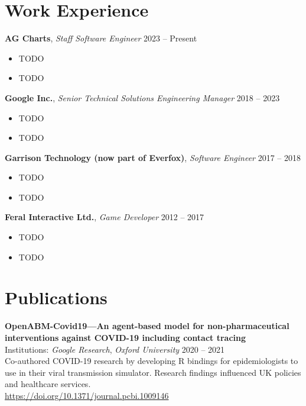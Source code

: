 \documentclass[a4paper,10pt]{article}
\begin{document}
{\begin{minipage}[t]{0.72\textwidth}
    \section*{\color{navy} Work Experience}
    \textbf{AG Charts}, \textit{Staff Software Engineer} \hfill 2023 -- Present
    \begin{itemize}[leftmargin=1.5em, nosep]
        \item TODO
        \item TODO
    \end{itemize}
    \vspace{0.5em}
    \textbf{Google Inc.}, \textit{Senior Technical Solutions Engineering Manager} \hfill 2018 -- 2023
    \begin{itemize}[leftmargin=1.5em, nosep]
        \item TODO
        \item TODO
    \end{itemize}
    \vspace{0.5em}
    \textbf{Garrison Technology (now part of Everfox)}, \textit{Software Engineer} \hfill 2017 -- 2018
    \begin{itemize}[leftmargin=1.5em, nosep]
        \item TODO
        \item TODO
    \end{itemize}
    \vspace{0.5em}
    \textbf{Feral Interactive Ltd.}, \textit{Game Developer} \hfill 2012 -- 2017
    \begin{itemize}[leftmargin=1.5em, nosep]
        \item TODO
        \item TODO
    \end{itemize}
    \section*{\color{navy} Publications}
    \textbf{OpenABM-Covid19—An agent-based model for non-pharmaceutical interventions against COVID-19 including contact tracing}\\
    Institutions: \textit{Google Research}, \textit{Oxford University} \hfill 2020 -- 2021\\[1.0em]
    Co-authored COVID-19 research by developing R bindings for epidemiologists to use in their viral transmission simulator. Research findings influenced UK policies and healthcare services.\\
    \href{https://doi.org/10.1371/journal.pcbi.1009146}{https://doi.org/10.1371/journal.pcbi.1009146}
\end{minipage}%
\vfill %
}%
\end{document}
